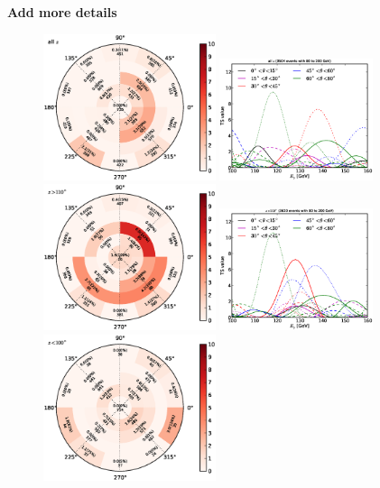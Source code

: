 \documentclass[aps,twocolumn,prd,superscriptaddress,showpacs,nofootinbib,fixfloat]{revtex4}
\begin{document}
\textbf{Add more details}

\begin{figure}[p]
  \centering
  \includegraphics[width=0.45\textwidth]{plots/polar_all.eps}
  \includegraphics[width=0.40\textwidth]{plots/scan_all.eps}
  \includegraphics[width=0.45\textwidth]{plots/polar_z.GT.110.eps}
  \includegraphics[width=0.40\textwidth]{plots/scan_z.GT.110.eps}
  \includegraphics[width=0.45\textwidth]{plots/polar_z.LE.100.eps}

\end{figure}
\end{document}
